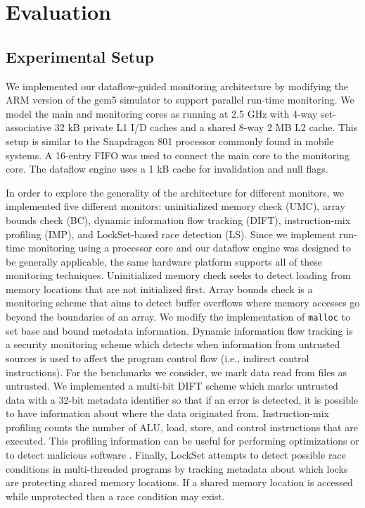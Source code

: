 \section{Evaluation}
\label{sec:monitoring_dift_drop.evaluation}

\subsection{Experimental Setup}
\label{sec:monitoring_dift_drop.evaluation.setup}

We implemented our dataflow-guided monitoring architecture by modifying the ARM
version of the gem5 simulator \cite{gem5} to support parallel run-time
monitoring. 
We model the main
and monitoring cores as running at 2.5 GHz with 4-way set-associative 32 kB
private L1 I/D caches and a shared 8-way 2 MB L2 cache. This setup is similar
to the Snapdragon 801 processor commonly found in mobile systems. A 16-entry
FIFO was used to connect the main core to the monitoring core. The dataflow
engine uses a 1 kB cache for invalidation and null flags.

In order to explore the generality of the architecture for different monitors,
we implemented five different monitors: uninitialized memory check (UMC), array
bounds check (BC), dynamic information flow tracking (DIFT), instruction-mix
profiling (IMP), and LockSet-based race detection (LS).  Since we implement run-time
monitoring using a processor core and our dataflow engine was designed to be
generally applicable, the same hardware platform supports all of these
monitoring techniques.  Uninitialized memory check seeks to detect loading from
memory locations that are not initialized first. Array bounds check is a monitoring
scheme that aims to detect buffer overflows where memory accesses go beyond the
boundaries of an array. We modify the implementation of {\tt malloc} to set
base and bound metadata information. Dynamic information flow tracking is a
security monitoring scheme which detects when information from untrusted
sources is used to affect the program control flow (i.e., indirect control
instructions). For the benchmarks we consider, we mark data read from files as
untrusted. We implemented a multi-bit DIFT scheme which marks untrusted data
with a 32-bit metadata identifier so that if an error is detected, it is
possible to have information about where the data originated from.
Instruction-mix profiling counts the number of ALU, load, store, and control
instructions that are executed. This profiling information can be useful for
performing optimizations or to detect malicious software \cite{tang-raid14}.
Finally, LockSet \cite{eraser-tocs97} attempts to detect possible race conditions in
multi-threaded programs by tracking metadata about which locks are protecting
shared memory locations. If a shared memory location is accessed while
unprotected then a race condition may exist.

